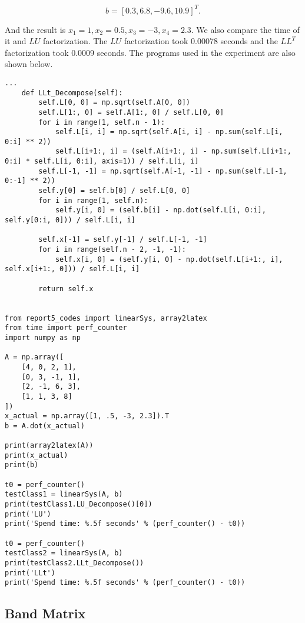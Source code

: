\documentclass[preprint,12pt]{elsarticle}
\begin{document}
\begin{equation}
\label{eq:lltb}
    b = [0.3, 6.8, -9.6, 10.9]^T.
  \end{equation}

And the result is $x_1 = 1, x_2 = 0.5, x_3 = -3, x_4 = 2.3$. We also compare the time of it and $LU$ factorization. The $LU$ factorization took 0.00078 seconds and the $LL^T$ factorization took 0.0009 seconds. The programs used in the experiment are also shown below.

\begin{lstlisting}
...
    def LLt_Decompose(self):
        self.L[0, 0] = np.sqrt(self.A[0, 0])
        self.L[1:, 0] = self.A[1:, 0] / self.L[0, 0]
        for i in range(1, self.n - 1):
            self.L[i, i] = np.sqrt(self.A[i, i] - np.sum(self.L[i, 0:i] ** 2))
            self.L[i+1:, i] = (self.A[i+1:, i] - np.sum(self.L[i+1:, 0:i] * self.L[i, 0:i], axis=1)) / self.L[i, i]
        self.L[-1, -1] = np.sqrt(self.A[-1, -1] - np.sum(self.L[-1, 0:-1] ** 2))
        self.y[0] = self.b[0] / self.L[0, 0]
        for i in range(1, self.n):
            self.y[i, 0] = (self.b[i] - np.dot(self.L[i, 0:i], self.y[0:i, 0])) / self.L[i, i]
        
        self.x[-1] = self.y[-1] / self.L[-1, -1]
        for i in range(self.n - 2, -1, -1):
            self.x[i, 0] = (self.y[i, 0] - np.dot(self.L[i+1:, i], self.x[i+1:, 0])) / self.L[i, i]
        
        return self.x


from report5_codes import linearSys, array2latex
from time import perf_counter
import numpy as np

A = np.array([
    [4, 0, 2, 1],
    [0, 3, -1, 1],
    [2, -1, 6, 3],
    [1, 1, 3, 8]
])
x_actual = np.array([1, .5, -3, 2.3]).T
b = A.dot(x_actual)

print(array2latex(A))
print(x_actual)
print(b)

t0 = perf_counter()
testClass1 = linearSys(A, b)
print(testClass1.LU_Decompose()[0])
print('LU')
print('Spend time: %.5f seconds' % (perf_counter() - t0))

t0 = perf_counter()
testClass2 = linearSys(A, b)
print(testClass2.LLt_Decompose())
print('LLt')
print('Spend time: %.5f seconds' % (perf_counter() - t0))
\end{lstlisting}

\subsection{Band Matrix}
\label{SS:3.3}
\end{document}
